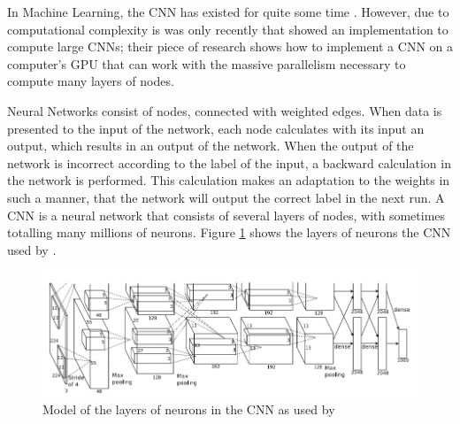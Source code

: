In Machine Learning, the CNN has existed for quite some time \citep{fukushima1980neocognition}.
However, due to computational complexity is was only recently that \citet{krizhevsky2012imagenet} showed an implementation to compute large CNNs;
their piece of research shows how to implement a CNN on a computer's GPU that can work with the massive parallelism necessary to compute many layers of nodes.

Neural Networks consist of nodes, connected with weighted edges.
When data is presented to the input of the network, each node calculates with its input an output, which results in an output of the network.
When the output of the network is incorrect according to the label of the input, a backward calculation in the network is performed.
This calculation makes an adaptation to the weights in such a manner, that the network will output the correct label in the next run.
A CNN is a neural network that consists of several layers of nodes, with sometimes totalling many millions of neurons.
Figure \ref{fig:cnn-alex} shows the layers of neurons the CNN used by \citeauthor{krizhevsky2012imagenet}.

\begin{figure}%
\centering
\ifx\showfig\undefined
\includegraphics[keepaspectratio=true,width=\textwidth]{images/alexnet2012.png} \fi
\caption{Model of the layers of neurons in the CNN as used by \citet{krizhevsky2012imagenet}}
\label{fig:cnn-alex}
\end{figure}

